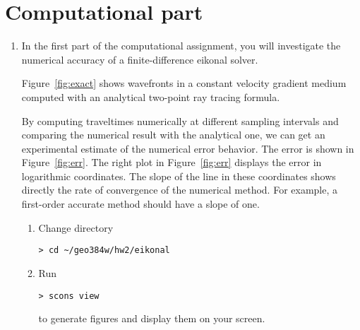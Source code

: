 \section{Computational part}

\lstset{language=python,numbers=left,numberstyle=\tiny,showstringspaces=false}

\begin{enumerate}

\item In the first part of the computational assignment, you will
  investigate the numerical accuracy of a finite-difference eikonal solver.

  {\small
    
  }

  Figure~\ref{fig:exact} shows wavefronts in a constant velocity
  gradient medium computed with an analytical two-point ray tracing
  formula.
 

  By computing traveltimes numerically at different sampling intervals
  and comparing the numerical result with the analytical one, we can
  get an experimental estimate of the numerical error behavior. The
  error is shown in Figure~\ref{fig:err}. The right plot in
  Figure~\ref{fig:err} displays the error in logarithmic coordinates. The
  slope of the line in these coordinates shows directly the rate of
  convergence of the numerical method. For example, a first-order
  accurate method should have a slope of one.


  \begin{enumerate}
  \item Change directory
\begin{verbatim}
> cd ~/geo384w/hw2/eikonal
\end{verbatim}
  \item Run
\begin{verbatim}
> scons view
\end{verbatim}
    to generate figures and display them on your screen.  


\end{enumerate}
\end{enumerate}
